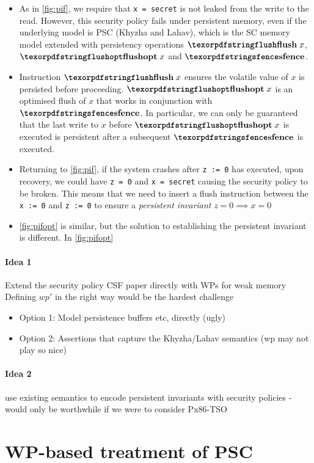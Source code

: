 \begin{itemize}
\item As in \cref{fig:pif}, we require that \verb|x = secret| is not
  leaked from the write to the read. However, this security policy
  fails under persistent memory, even if the underlying model is PSC
  (Khyzha and Lahav), which is the SC memory model extended with
  persistency operations $\flInst{x}$, $\floInst{x}$ and
  $\sfenceInstn$. 
\item Instruction $\flInst{x}$ ensures the volatile value
  of $x$ is persisted before proceeding. $\floInst{x}$ is an optimised
  flush of $x$ that works in conjunction with $\sfenceInstn$. In
  particular, we can only be guaranteed that the last write to $x$
  before $\floInst{x}$ is executed is persistent after a subsequent
  $\sfenceInstn$ is executed.
\item Returning to \cref{fig:pif}, if the system crashes after
  \verb|z := 0| has executed, upon recovery, we could have
  \verb|z = 0| and \verb|x = secret| causing the security policy to be
  broken.  This means that we need to insert a flush instruction
  between the \verb|x := 0| and \verb|z := 0| to ensure a {\em
    persistent invariant} $z = 0 \implies x = 0$
\item \cref{fig:pifopt} is similar, but the solution to establishing the persistent invariant is different. In \cref{fig:pifopt}
\end{itemize}


\paragraph{Idea 1} Extend the security policy CSF paper directly with WPs for weak memory
Defining $wp'$ in the right way would be the hardest challenge
\begin{itemize}
\item Option 1: Model persistence buffers etc, directly (ugly)
\item Option 2: Assertions that capture the Khyzha/Lahav semantics (wp may not play so nice) 
\end{itemize}

\paragraph{Idea 2} use existing semantics to encode persistent invariants with security policies
- would only be worthwhile if we were to consider Px86-TSO

\section{WP-based treatment of PSC} 

